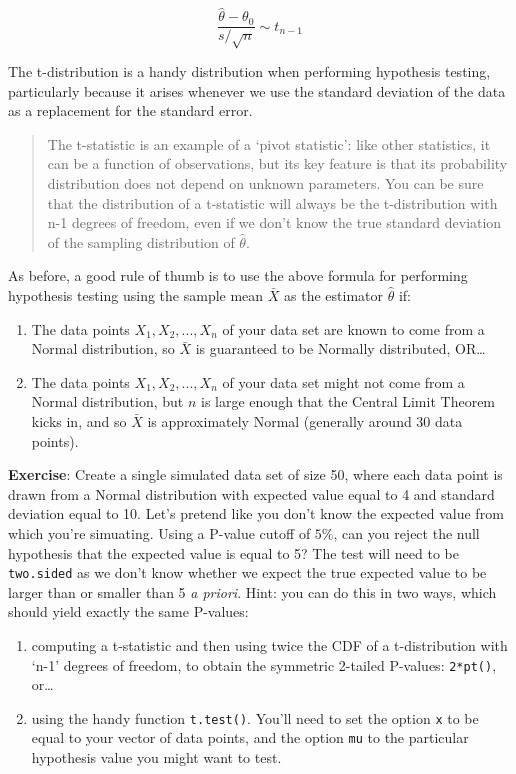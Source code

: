 \documentclass[
]{book}
\begin{document}
\[\frac{\hat{\theta} - \theta_0}{s/\sqrt{n}} \sim t_{n-1}\]

The t-distribution is a handy distribution when performing hypothesis testing, particularly because it arises whenever we use the standard deviation of the data as a replacement for the standard error.

\begin{quote}
The t-statistic is an example of a `pivot statistic': like other statistics, it can be a function of observations, but its key feature is that its probability distribution does not depend on unknown parameters. You can be sure that the distribution of a t-statistic will always be the t-distribution with n-1 degrees of freedom, even if we don't know the true standard deviation of the sampling distribution of \(\hat{\theta}\).
\end{quote}

As before, a good rule of thumb is to use the above formula for performing hypothesis testing using the sample mean \(\bar{X}\) as the estimator \(\hat{\theta}\) if:

\begin{enumerate}
\def\labelenumi{\arabic{enumi}.}
\item
  The data points \(X_1, X_2, ..., X_n\) of your data set are known to come from a Normal distribution, so \(\bar{X}\) is guaranteed to be Normally distributed, OR\ldots{}
\item
  The data points \(X_1, X_2, ..., X_n\) of your data set might not come from a Normal distribution, but \(n\) is large enough that the Central Limit Theorem kicks in, and so \(\bar{X}\) is approximately Normal (generally around 30 data points).
\end{enumerate}

\textbf{Exercise}: Create a single simulated data set of size 50, where each data point is drawn from a Normal distribution with expected value equal to 4 and standard deviation equal to 10. Let's pretend like you don't know the expected value from which you're simuating. Using a P-value cutoff of \(5\%\), can you reject the null hypothesis that the expected value is equal to 5? The test will need to be \texttt{two.sided} as we don't know whether we expect the true expected value to be larger than or smaller than 5 \emph{a priori}.
Hint: you can do this in two ways, which should yield exactly the same P-values:

\begin{enumerate}
\def\labelenumi{\arabic{enumi}.}
\item
  computing a t-statistic and then using twice the CDF of a t-distribution with `n-1' degrees of freedom, to obtain the symmetric 2-tailed P-values: \texttt{2*pt()}, or\ldots{}
\item
  using the handy function \texttt{t.test()}. You'll need to set the option \texttt{x} to be equal to your vector of data points, and the option \texttt{mu} to the particular hypothesis value you might want to test.
\end{enumerate}
\end{document}
